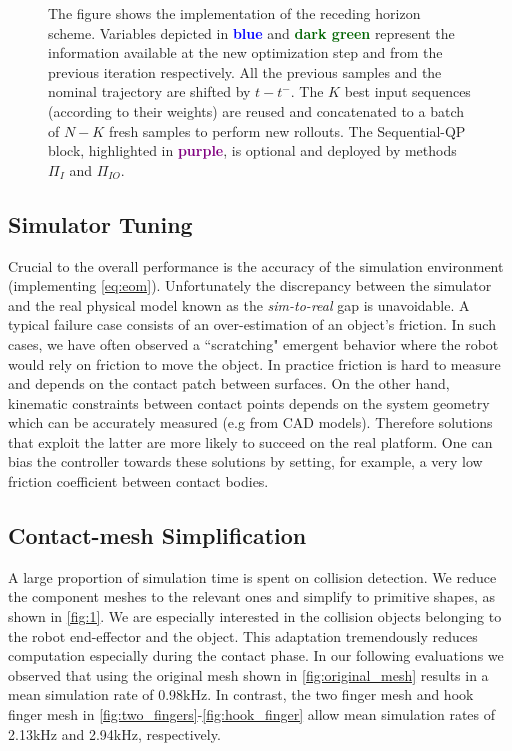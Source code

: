 \begin{figure}[t]
    \vspace{0.1cm}
    \caption{The figure shows the implementation of the receding horizon scheme. Variables depicted in \textcolor{blue}{\textbf{blue}} and \textcolor{darkgreen}{\textbf{dark green}} represent the information available at the new optimization step and from the previous iteration respectively. All the previous samples and the nominal trajectory are shifted by $ t - t^-$. The $K$ best input sequences (according to their weights) are reused and concatenated to a batch of $N-K$ fresh samples to perform new rollouts. The Sequential-QP block, highlighted in \textcolor{purple}{\textbf{purple}}, is optional and deployed by methods $\Pi_{I}$ and $\Pi_{IO}$.}
    \label{fig:receding_horizon}
\end{figure}

\subsection{Simulator Tuning}
Crucial to the overall performance is the accuracy of the simulation environment (implementing \eqref{eq:eom}). Unfortunately the discrepancy between the simulator and the real physical model known as the \emph{sim-to-real} gap is unavoidable. A typical failure case consists of an over-estimation of an object's friction. In such cases, we have often observed a ``scratching" emergent behavior where the robot would rely on friction to move the object. In practice friction is hard to measure and depends on the contact patch between surfaces. On the other hand, kinematic constraints between contact points depends on the system geometry which can be accurately measured (e.g from CAD models). Therefore solutions that exploit the latter are more likely to succeed on the real platform. One can bias the controller towards these solutions by setting, for example, a very low friction coefficient between contact bodies.

\subsection{Contact-mesh Simplification}
A large proportion of simulation time is spent on collision detection. We reduce the component meshes to the relevant ones and simplify to primitive shapes, as shown in \fig\ref{fig:1}. We are especially interested in the collision objects belonging to the robot end-effector and the object. This adaptation tremendously reduces computation especially during the contact phase. In our following evaluations we observed that using the original mesh shown in \fig\ref{fig:original_mesh} results in a mean simulation rate of 0.98kHz. In contrast, the two finger mesh and hook finger mesh in \fig\ref{fig:two_fingers}-\ref{fig:hook_finger} allow mean simulation rates of 2.13kHz and 2.94kHz, respectively.

